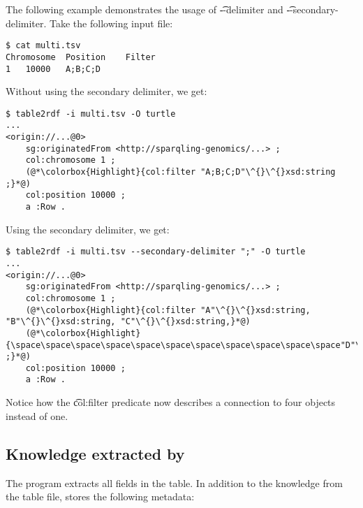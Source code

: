   The following example demonstrates the usage of \t{-{}-delimiter} and
  \t{-{}-secondary-delimiter}.  Take the following input file:
\begin{siderules}
\begin{verbatim}
$ cat multi.tsv
Chromosome	Position	Filter
1	10000	A;B;C;D
\end{verbatim}
\end{siderules}

  Without using the secondary delimiter, we get:

\begin{siderules}
\begin{lstlisting}
$ table2rdf -i multi.tsv -O turtle
...
<origin://...@0>
    sg:originatedFrom <http://sparqling-genomics/...> ;
    col:chromosome 1 ;
    (@*\colorbox{Highlight}{col:filter "A;B;C;D"\^{}\^{}xsd:string ;}*@)
    col:position 10000 ;
    a :Row .
\end{lstlisting}
\end{siderules}

  Using the secondary delimiter, we get:

\begin{siderules}
\begin{lstlisting}
$ table2rdf -i multi.tsv --secondary-delimiter ";" -O turtle
...
<origin://...@0>
    sg:originatedFrom <http://sparqling-genomics/...> ;
    col:chromosome 1 ;
    (@*\colorbox{Highlight}{col:filter "A"\^{}\^{}xsd:string, "B"\^{}\^{}xsd:string, "C"\^{}\^{}xsd:string,}*@)
    (@*\colorbox{Highlight}{\space\space\space\space\space\space\space\space\space\space\space"D"\^{}\^{}xsd:string ;}*@)
    col:position 10000 ;
    a :Row .
\end{lstlisting}
\end{siderules}

  Notice how the \t{col:filter} predicate now describes a
  connection to four objects instead of one.

\subsection{Knowledge extracted by }

  The  program extracts all fields in the table.  In addition
  to the knowledge from the table file,  stores the following
  metadata:

